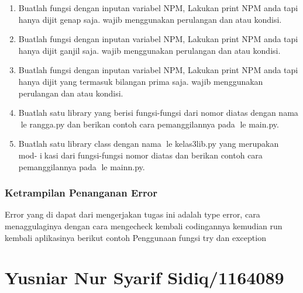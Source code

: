 \begin{enumerate}
    \item Buatlah fungsi dengan inputan variabel NPM, Lakukan print NPM anda tapi
    hanya dijit genap saja. wajib menggunakan perulangan dan atau kondisi.
    

    \item Buatlah fungsi dengan inputan variabel NPM, Lakukan print NPM anda tapi
    hanya dijit ganjil saja. wajib menggunakan perulangan dan atau kondisi.
    

    \item Buatlah fungsi dengan inputan variabel NPM, Lakukan print NPM anda tapi
    hanya dijit yang termasuk bilangan prima saja. wajib menggunakan perulangan
    dan atau kondisi.
    

    \item Buatlah satu library yang berisi fungsi-fungsi dari nomor diatas dengan nama
    le rangga.py dan berikan contoh cara pemanggilannya pada le main.py.
    

    \item Buatlah satu library class dengan nama le kelas3lib.py yang merupakan mod-
    ikasi dari fungsi-fungsi nomor diatas dan berikan contoh cara pemanggilannya
    pada le mainn.py.
    
    
\end{enumerate}
\subsubsection{Ketrampilan Penanganan Error}
Error yang di dapat dari mengerjakan tugas ini adalah type error, cara menaggulaginya dengan cara mengecheck kembali codingannya
kemudian run kembali aplikasinya
berikut contoh Penggunaan fungsi try dan exception


\section{Yusniar Nur Syarif Sidiq/1164089}
